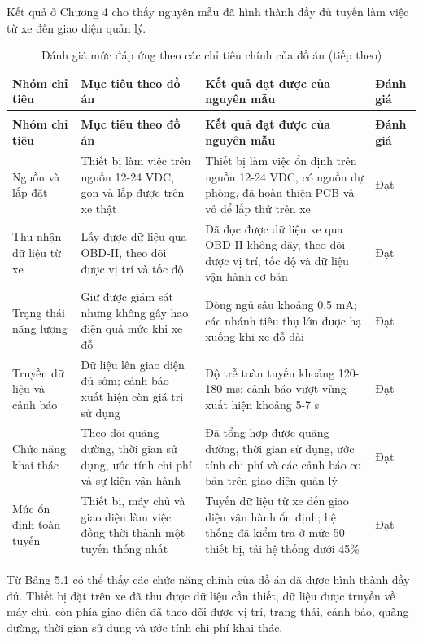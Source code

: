 \documentclass[a4paper]{extarticle}
\newcommand{\thesissettableid}[2]{%
  \renewcommand{\thetable}{#1}%
  \renewcommand{\theHtable}{#2}%
}
\begin{document}
Kết quả ở Chương 4 cho thấy nguyên mẫu đã hình thành đầy đủ tuyến làm việc từ xe đến giao diện quản lý.

{\thesissettableid{5.1}{condensed-r2-bang-5-1-danh-gia-muc-dap-ung-theo-cac-chi-tieu-chinh-cua-do-an}
\def\LTcaptype{table}
\begin{longtable}{|L{(\linewidth - 6\tabcolsep) * }|L{(\linewidth - 6\tabcolsep) * }|L{(\linewidth - 6\tabcolsep) * }|L{(\linewidth - 6\tabcolsep) * }|}
\caption{Đánh giá mức đáp ứng theo các chỉ tiêu chính của đồ án}\label{tab:condensed-r2-bang-5-1-danh-gia-muc-dap-ung-theo-cac-chi-tieu-chinh-cua-do-an}\\
\hline
\textbf{Nhóm chỉ tiêu} & \textbf{Mục tiêu theo đồ án} & \textbf{Kết quả đạt được của nguyên mẫu} & \textbf{Đánh giá} \\
\hline
\endfirsthead
\caption[]{Đánh giá mức đáp ứng theo các chỉ tiêu chính của đồ án (tiếp theo)}\\
\hline
\textbf{Nhóm chỉ tiêu} & \textbf{Mục tiêu theo đồ án} & \textbf{Kết quả đạt được của nguyên mẫu} & \textbf{Đánh giá} \\
\hline
\endhead
\endfoot
\endlastfoot
Nguồn và lắp đặt & Thiết bị làm việc trên nguồn 12-24 VDC, gọn và lắp được trên xe thật & Thiết bị làm việc ổn định trên nguồn 12-24 VDC, có nguồn dự phòng, đã hoàn thiện PCB và vỏ để lắp thử trên xe & Đạt \\\hline
Thu nhận dữ liệu từ xe & Lấy được dữ liệu qua OBD-II, theo dõi được vị trí và tốc độ & Đã đọc được dữ liệu xe qua OBD-II không dây, theo dõi được vị trí, tốc độ và dữ liệu vận hành cơ bản & Đạt \\\hline
Trạng thái năng lượng & Giữ được giám sát nhưng không gây hao điện quá mức khi xe đỗ & Dòng ngủ sâu khoảng 0,5 mA; các nhánh tiêu thụ lớn được hạ xuống khi xe đỗ dài & Đạt \\\hline
Truyền dữ liệu và cảnh báo & Dữ liệu lên giao diện đủ sớm; cảnh báo xuất hiện còn giá trị sử dụng & Độ trễ toàn tuyến khoảng 120-180 ms; cảnh báo vượt vùng xuất hiện khoảng 5-7 s & Đạt \\\hline
Chức năng khai thác & Theo dõi quãng đường, thời gian sử dụng, ước tính chi phí và sự kiện vận hành & Đã tổng hợp được quãng đường, thời gian sử dụng, ước tính chi phí và các cảnh báo cơ bản trên giao diện quản lý & Đạt \\\hline
Mức ổn định toàn tuyến & Thiết bị, máy chủ và giao diện làm việc đồng thời thành một tuyến thống nhất & Tuyến dữ liệu từ xe đến giao diện vận hành ổn định; hệ thống đã kiểm tra ở mức 50 thiết bị, tải hệ thống dưới 45\% & Đạt \\\hline
\end{longtable}
}
Từ Bảng 5.1 có thể thấy các chức năng chính của đồ án đã được hình thành đầy đủ. Thiết bị đặt trên xe đã thu được dữ liệu cần thiết, dữ liệu được truyền về máy chủ, còn phía giao diện đã theo dõi được vị trí, trạng thái, cảnh báo, quãng đường, thời gian sử dụng và ước tính chi phí khai thác.
\end{document}
